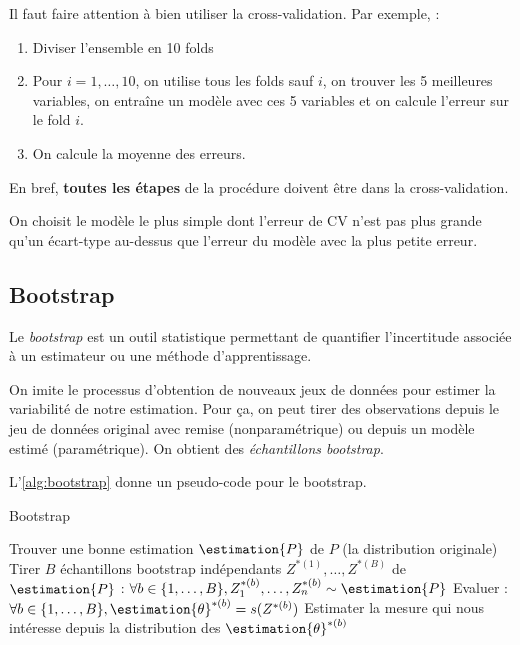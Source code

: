         Il faut faire attention à bien utiliser la cross-validation. Par exemple, :
        \begin{enumerate}
            \item Diviser l'ensemble en 10 folds
            \item Pour \(i = 1, \dots, 10\), on utilise tous les folds sauf \(i\), on trouver les 5 meilleures variables, on entraîne un modèle avec ces 5 variables et on calcule l'erreur sur le fold \(i\).
            \item On calcule la moyenne des erreurs.
        \end{enumerate}
        En bref, \textbf{toutes les étapes} de la procédure doivent être dans la cross-validation.

        On choisit le modèle le plus simple dont l'erreur de CV n'est pas plus grande qu'un écart-type au-dessus que l'erreur du modèle avec la plus petite erreur.

    \subsection{Bootstrap}
        \begin{definition}
            Le \textit{bootstrap} est un outil statistique permettant de quantifier l'incertitude associée à un estimateur ou une méthode d'apprentissage.

            On imite le processus d'obtention de nouveaux jeux de données pour estimer la variabilité de notre estimation. Pour ça, on peut tirer des observations depuis le jeu de données original avec remise (nonparamétrique) ou depuis un modèle estimé (paramétrique). On obtient des \textit{échantillons bootstrap}.

            L'\cref{alg:bootstrap} donne un pseudo-code pour le bootstrap.
        \end{definition}

        \begin{algorithm}
            \caption{Bootstrap}
            \label{alg:bootstrap}
            \begin{algorithmic}[1]
                \State Trouver une bonne estimation \(\estimation{P}\) de \(P\) (la distribution originale)
                \State Tirer \(B\) échantillons bootstrap indépendants \(Z^{*(1)}, \dots, Z^{*(B)}\) de \(\estimation{P}\) : \(\forall b \in \{1, \dots, B\}, Z_1^{*(b)}, \dots, Z_n^{*(b)} \sim \estimation{P}\)
                \State Evaluer : \(\forall b \in \{1, \dots, B\}, \estimation{\theta}^{*(b)} = s(Z^{*(b)})\)
                \State Estimater la mesure qui nous intéresse depuis la distribution des \(\estimation{\theta}^{*(b)}\)
            \end{algorithmic}
        \end{algorithm}

